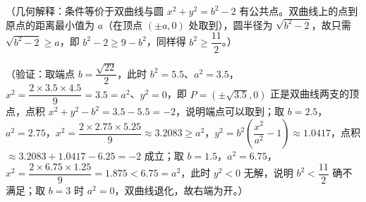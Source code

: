 \begin{answer}
（几何解释：条件等价于双曲线与圆 \(x^{2}+y^{2}=b^{2}-2\) 有公共点。双曲线上的点到原点的距离最小值为 \(a\)（在顶点 \((\pm a,0)\) 处取到），圆半径为 \(\sqrt{b^{2}-2}\)，故只需 \(\sqrt{b^{2}-2}\geqslant a\)，即 \(b^{2}-2\geqslant9-b^{2}\)，同样得 \(b^{2}\geqslant\dfrac{11}{2}\)。）

（验证：取端点 \(b=\dfrac{\sqrt{22}}{2}\)，此时 \(b^{2}=5.5\)、\(a^{2}=3.5\)，\(x^{2}=\dfrac{2\times3.5\times4.5}{9}=3.5=a^{2}\)、\(y^{2}=0\)，即 \(P=(\pm\sqrt{3.5},0)\) 正是双曲线两支的顶点，点积 \(x^{2}+y^{2}-b^{2}=3.5-5.5=-2\)，说明端点可以取到；取 \(b=2.5\)，\(a^{2}=2.75\)，\(x^{2}=\dfrac{2\times2.75\times5.25}{9}\approx3.2083\geqslant a^{2}\)，\(y^{2}=b^{2}\left(\dfrac{x^{2}}{a^{2}}-1\right)\approx1.0417\)，点积 \(\approx3.2083+1.0417-6.25=-2\) 成立；取 \(b=1.5\)，\(a^{2}=6.75\)，\(x^{2}=\dfrac{2\times6.75\times1.25}{9}=1.875<6.75=a^{2}\)，此时 \(y^{2}<0\) 无解，说明 \(b^{2}<\dfrac{11}{2}\) 确不满足；取 \(b=3\) 时 \(a^{2}=0\)，双曲线退化，故右端为开。）


\gkanswer{答案（2）：\(b\in\left[\dfrac{\sqrt{22}}{2},3\right)\)。}

\end{answer}
